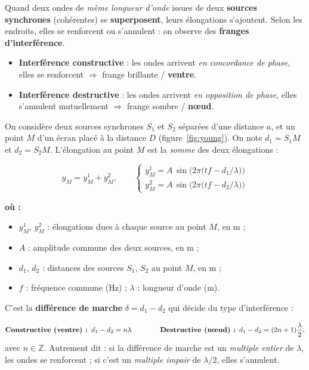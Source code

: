 \documentclass[11pt,a4paper]{article}
\newenvironment{ou}{%
  \par\smallskip\noindent\textbf{où :}\nopagebreak
  \begin{itemize}[leftmargin=1.8em,topsep=2pt,itemsep=1.5pt,parsep=0pt]}%
  {\end{itemize}}
\begin{document}
\begin{definition}[interférences]
Quand deux ondes de \emph{même longueur d'onde} issues de deux \textbf{sources synchrones}
(cohérentes) se \textbf{superposent}, leurs élongations s'ajoutent. Selon les endroits, elles
se renforcent ou s'annulent : on observe des \textbf{franges d'interférence}.
\begin{itemize}[leftmargin=1.5em,topsep=2pt,itemsep=2pt]
  \item \textbf{Interférence constructive} : les ondes arrivent \emph{en concordance de phase},
        elles se renforcent $\Rightarrow$ frange brillante / \textbf{ventre}.
  \item \textbf{Interférence destructive} : les ondes arrivent \emph{en opposition de phase},
        elles s'annulent mutuellement $\Rightarrow$ frange sombre / \textbf{nœud}.
\end{itemize}
\end{definition}

On considère deux sources synchrones $S_1$ et $S_2$ séparées d'une distance $a$, et un point
$M$ d'un écran placé à la distance $D$ (figure~\ref{fig:young}). On note $d_1 = S_1M$ et
$d_2 = S_2M$. L'élongation au point $M$ est la \emph{somme} des deux élongations :
\begin{formule}
\[ y_M = y_M^{1} + y_M^{2},\qquad
   \begin{cases}
     y_M^{1} = A\,\sin\!\Big(2\pi\big(t f - d_1/\lambda\big)\Big)\\[4pt]
     y_M^{2} = A\,\sin\!\Big(2\pi\big(t f - d_2/\lambda\big)\Big)
   \end{cases} \]
\begin{ou}
  \item $y_M^{1},\,y_M^{2}$ : élongations dues à chaque source au point $M$, en \si{\metre} ;
  \item $A$ : amplitude commune des deux sources, en \si{\metre} ;
  \item $d_1,\,d_2$ : distances des sources $S_1$, $S_2$ au point $M$, en \si{\metre} ;
  \item $f$ : fréquence commune (\si{\hertz}) ; $\lambda$ : longueur d'onde (\si{\metre}).
\end{ou}
\end{formule}

C'est la \textbf{différence de marche} $\delta = d_1 - d_2$ qui décide du type d'interférence :

\begin{theoreme}
\[ \text{\bf Constructive (ventre) : } d_1 - d_2 = n\lambda
   \qquad\qquad
   \text{\bf Destructive (nœud) : } d_1 - d_2 = (2n+1)\frac{\lambda}{2}, \]
avec $n\in\mathbb{Z}$. Autrement dit : si la différence de marche est un \emph{multiple entier}
de $\lambda$, les ondes se renforcent ; si c'est un \emph{multiple impair} de $\lambda/2$,
elles s'annulent.
\end{theoreme}
\end{document}
